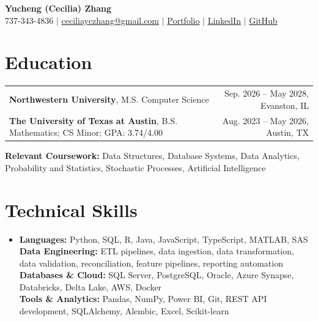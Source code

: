 \documentclass[letterpaper,10pt]{article}
\begin{document}
\begin{center}
{\Large\textbf{Yucheng (Cecilia) Zhang}}\\[-1pt]
\small 737-343-4836 $|$ \href{mailto:ceciliayczhang@gmail.com}{ceciliayczhang@gmail.com} $|$
\href{https://yczhangcc.github.io/yuchengzhang_portfolio/}{Portfolio} $|$
\href{https://www.linkedin.com/in/yczcecilia/}{LinkedIn} $|$
\href{https://github.com/yczhangcc}{GitHub}
\end{center}
\vspace{-8pt}

\section{Education}
{\small
\begin{tabular*}{0.985\textwidth}[t]{l@{\extracolsep{\fill}}r}
\textbf{Northwestern University}, M.S. Computer Science & Sep. 2026 -- May 2028, Evanston, IL \\
\textbf{The University of Texas at Austin}, B.S. Mathematics; CS Minor; GPA: 3.74/4.00 & Aug. 2023 -- May 2026, Austin, TX \\
\end{tabular*}}
\vspace{-2pt}
\footnotesize{\textbf{Relevant Coursework:} Data Structures, Database Systems, Data Analytics, Probability and Statistics, Stochastic Processes, Artificial Intelligence}
\vspace{-5pt}

\section{Technical Skills}
\begin{itemize}[leftmargin=0.11in,label={},topsep=1pt,itemsep=0pt]
\footnotesize\item{
\textbf{Languages:} Python, SQL, R, Java, JavaScript, TypeScript, MATLAB, SAS \\
\textbf{Data Engineering:} ETL pipelines, data ingestion, data transformation, data validation, reconciliation, feature pipelines, reporting automation \\
\textbf{Databases \& Cloud:} SQL Server, PostgreSQL, Oracle, Azure Synapse, Databricks, Delta Lake, AWS, Docker \\
\textbf{Tools \& Analytics:} Pandas, NumPy, Power BI, Git, REST API development, SQLAlchemy, Alembic, Excel, Scikit-learn
}
\end{itemize}
\vspace{-7pt}
\end{document}
